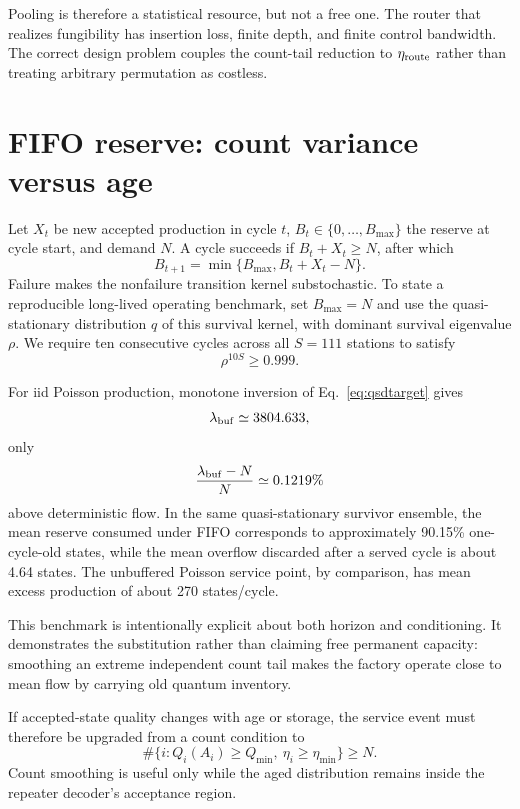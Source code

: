 \documentclass[aps,prx,reprint,superscriptaddress,nofootinbib,longbibliography,floatfix]{revtex4-2}
\begin{document}
Pooling is therefore a statistical resource, but not a free one. The router that realizes fungibility has insertion loss, finite depth, and finite control bandwidth. The correct design problem couples the count-tail reduction to $\eta_{\rm route}$ rather than treating arbitrary permutation as costless.

\section{FIFO reserve: count variance versus age}
Let $X_t$ be new accepted production in cycle $t$, $B_t\in\{0,\ldots,B_{\max}\}$ the reserve at cycle start, and demand $N$. A cycle succeeds if $B_t+X_t\ge N$, after which
\begin{equation}
B_{t+1}=\min\{B_{\max},B_t+X_t-N\}.
\end{equation}
Failure makes the nonfailure transition kernel substochastic. To state a reproducible long-lived operating benchmark, set $B_{\max}=N$ and use the quasi-stationary distribution $q$ of this survival kernel, with dominant survival eigenvalue $\rho$. We require ten consecutive cycles across all $S=111$ stations to satisfy
\begin{equation}
\rho^{10S}\ge0.999.
\label{eq:qsdtarget}
\end{equation}

For iid Poisson production, monotone inversion of Eq.~\eqref{eq:qsdtarget} gives
\begin{equation}
\lambda_{\rm buf}\simeq3804.633,
\end{equation}
only
\begin{equation}
\frac{\lambda_{\rm buf}-N}{N}\simeq0.1219\%
\end{equation}
above deterministic flow. In the same quasi-stationary survivor ensemble, the mean reserve consumed under FIFO corresponds to approximately 90.15\% one-cycle-old states, while the mean overflow discarded after a served cycle is about 4.64 states. The unbuffered Poisson service point, by comparison, has mean excess production of about 270 states/cycle.

This benchmark is intentionally explicit about both horizon and conditioning. It demonstrates the substitution rather than claiming free permanent capacity: smoothing an extreme independent count tail makes the factory operate close to mean flow by carrying old quantum inventory.

If accepted-state quality changes with age or storage, the service event must therefore be upgraded from a count condition to
\begin{equation}
\#\{i:Q_i(A_i)\ge Q_{\min},\ \eta_i\ge\eta_{\min}\}\ge N.
\end{equation}
Count smoothing is useful only while the aged distribution remains inside the repeater decoder's acceptance region.
\end{document}
